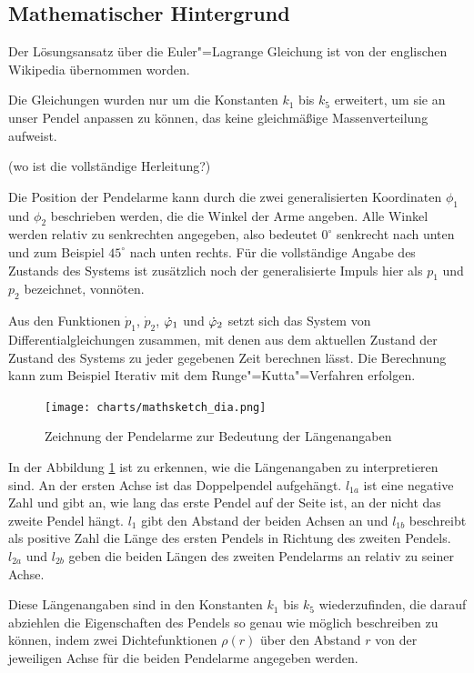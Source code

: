 \subsection{Mathematischer Hintergrund}

Der Lösungsansatz über die Euler"=Lagrange Gleichung ist von der englischen Wikipedia übernommen worden.
\citep{wikidoublependulum}

Die Gleichungen wurden nur um die Konstanten $k_1$ bis $k_5$ erweitert, um sie an unser Pendel anpassen zu können, das keine gleichmäßige Massenverteilung aufweist.

(\TODO wo ist die vollständige Herleitung?)

Die Position der Pendelarme kann durch die zwei generalisierten Koordinaten $\phi_1$ und $\phi_2$ beschrieben werden, die die Winkel der Arme angeben.
Alle Winkel werden relativ zu senkrechten angegeben, also bedeutet $0^\circ$ senkrecht nach unten und zum Beispiel $45^\circ$ nach unten rechts.
Für die vollständige Angabe des Zustands des Systems ist zusätzlich noch der generalisierte Impuls hier als $p_1$ und $p_2$ bezeichnet, vonnöten.

Aus den Funktionen $\dot{p}_1$, $\dot{p}_2$, $\dot{\varphi}_1$ und $\dot{\varphi}_2$ setzt sich das System von Differentialgleichungen zusammen, mit denen aus dem aktuellen Zustand der Zustand des Systems zu jeder gegebenen Zeit berechnen lässt.
Die Berechnung kann zum Beispiel Iterativ mit dem Runge"=Kutta"=Verfahren erfolgen.

\begin{figure}[bht]
  \texttt{[image: charts/mathsketch\_dia.png]}
  \caption{Zeichnung der Pendelarme zur Bedeutung der Längenangaben}
  \label{fig:mathsketch}
\end{figure}

In der Abbildung \ref{fig:mathsketch} ist zu erkennen, wie die Längenangaben zu interpretieren sind.
An der ersten Achse ist das Doppelpendel aufgehängt.
$l_{1a}$ ist eine negative Zahl und gibt an, wie lang das erste Pendel auf der Seite ist, an der nicht das zweite Pendel hängt.
$l_1$ gibt den Abstand der beiden Achsen an und $l_{1b}$ beschreibt als positive Zahl die Länge des ersten Pendels in Richtung des zweiten Pendels.
$l_{2a}$ und $l_{2b}$ geben die beiden Längen des zweiten Pendelarms an relativ zu seiner Achse.

Diese Längenangaben sind in den Konstanten $k_1$ bis $k_5$ wiederzufinden, die darauf abziehlen die Eigenschaften des Pendels so genau wie möglich beschreiben zu können, indem zwei Dichtefunktionen $\rho(r)$ über den Abstand $r$ von der jeweiligen Achse für die beiden Pendelarme angegeben werden.

